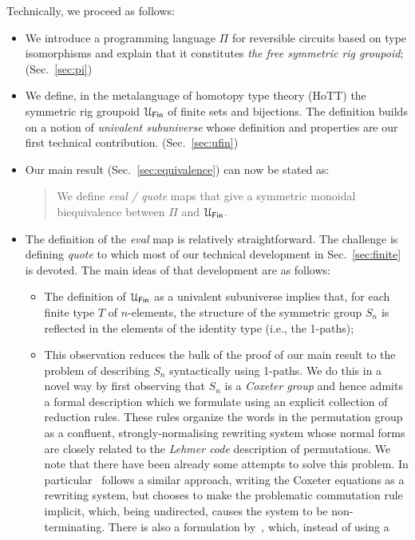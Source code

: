 Technically, we proceed as follows:
\begin{itemize}
\item We introduce a programming language $\Pi$ for reversible circuits based on type
  isomorphisms and explain that it constitutes \emph{the free symmetric rig
    groupoid}; (Sec.~\ref{sec:pi})
\item We define, in the metalanguage of homotopy type theory (HoTT) the
  symmetric rig groupoid $\UFin$ of finite sets and bijections. The definition
  builds on a notion of \emph{univalent subuniverse} whose definition and
  properties are our first technical contribution. (Sec.~\ref{sec:ufin})
\item Our main result (Sec.~\ref{sec:equivalence}) can now be stated as:
\begin{quote}
 We define \emph{eval / quote} maps that give a symmetric monoidal biequivalence
 between $\Pi$ and $\UFin$.
\end{quote}
\item The definition of the \emph{eval} map is relatively straightforward. The
  challenge is defining \emph{quote} to which most of our technical development
  in Sec.~\ref{sec:finite} is devoted. The main ideas of that development are as
  follows:
  \begin{itemize}
    \item The definition of $\UFin$ as a univalent subuniverse implies that, for
      each finite type $T$ of $n$-elements, the structure of the symmetric group
      $S_n$ is reflected in the elements of the identity type (i.e., the
      1-paths);
    \item This observation reduces the bulk of the proof of our main result to
      the problem of describing $S_n$ syntactically using 1-paths. We do this in
      a novel way by first observing that $S_n$ is a \emph{Coxeter group} and
      hence admits a formal description which we formulate using an explicit
      collection of reduction rules. These rules organize the words in the
      permutation group as a confluent, strongly-normalising rewriting system
      whose normal forms are closely related to the \emph{Lehmer code}
      description of permutations. We note that there have been already some
      attempts to solve this problem. In particular~\citet{LAFONT2003257}
      follows a similar approach, writing the Coxeter equations as a rewriting
      system, but chooses to make the problematic commutation rule implicit,
      which, being undirected, causes the system to be non-terminating. There
      is also a formulation by~\citet{Hiver-coq}, which, instead of using a

\end{itemize}
\end{itemize}
